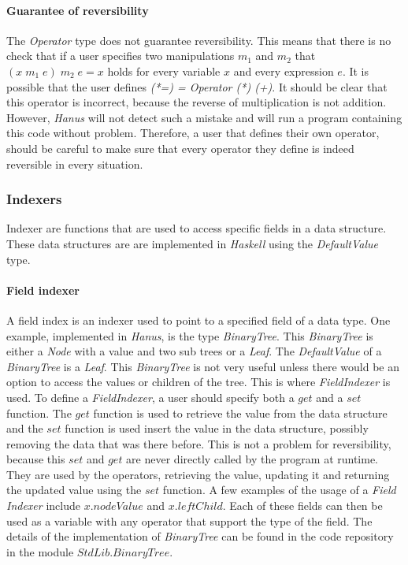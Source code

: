 \documentclass[12pt,a4paper]{article}
\begin{document}
	\paragraph{Guarantee of reversibility}
	The \textit{Operator} type does not guarantee reversibility. This means that there is no check that if a user specifies two manipulations $m_1$ and $m_2$ that $(x \; m_1 \; e) \; m_2 \; e = x$ holds for every variable $x$ and every expression $e$. It is possible that the user defines \textit{ (*=) = Operator (*) (+)}. It should be clear that this operator is incorrect, because the reverse of multiplication is not addition. However, \textit{Hanus} will not detect such a mistake and will run a program containing this code without problem. Therefore, a user that defines their own operator, should be careful to make sure that every operator they define is indeed reversible in every situation. 
	\subsubsection{Indexers}	
	Indexer are functions that are used to access specific fields in a data structure. These data structures are are implemented in \textit{Haskell} using the \textit{DefaultValue} type.
	\paragraph{Field indexer}
	A field index is an indexer used to point to a specified field of a data type. One example, implemented in \textit{Hanus}, is the type \textit{BinaryTree}. This \textit{BinaryTree} is either a \textit{Node} with a value and two sub trees or a \textit{Leaf}. The \textit{DefaultValue} of a \textit{BinaryTree} is a \textit{Leaf}. This \textit{BinaryTree} is not very useful unless there would be an option to access the values or children of the tree. This is where \textit{FieldIndexer} is used. To define a \textit{FieldIndexer}, a user should specify both a $get$ and a $set$ function. The $get$ function is used to retrieve the value from the data structure and the $set$ function is used insert the value in the data structure, possibly removing the data that was there before. This is not a problem for reversibility, because this $set$ and $get$ are never directly called by the program at runtime. They are used by the operators, retrieving the value, updating it and returning the updated value using the $set$ function. A few examples of the usage of a \textit{Field Indexer} include $x.nodeValue$ and $x.leftChild$. Each of these fields can then be used as a variable with any operator that support the type of the field.  The details of the implementation of \textit{BinaryTree} can be found in the code repository in the module $StdLib.BinaryTree$.
\end{document}
